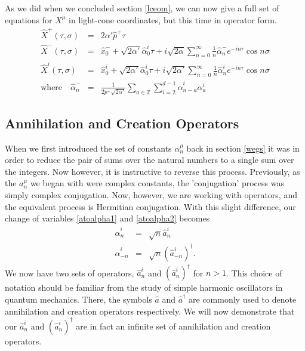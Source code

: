 \documentclass[a4paper,12pt]{article}
\numberwithin{equation}{section}
\begin{document}
As we did when we concluded section \ref{lceom}, we can now give a full set of equations for $X^\mu$ in light-cone coordinates, but this time in operator form.
\begin{eqnarray}
\hat{X}^+(\tau,\sigma) &=& 2\alpha'\hat{p}^+\tau\label{operatorexpansionb}\\
\hat{X}^-(\tau,\sigma) &=& \hat{x}_0^- + \sqrt{2\alpha'}\hat{\alpha}_0^i\tau + i\sqrt{2\alpha}\sum_{n=0}^\infty\frac{1}{n}\hat{\alpha}_n^-e^{-in\tau}\cos n\sigma\\
\hat{X}^i(\tau,\sigma) &=& \hat{x}_0^i +\sqrt{2\alpha'}\hat{\alpha}_0^i\tau + i\sqrt{2\alpha'}\sum_{n=0}^\infty\frac{1}{n}\hat{\alpha}_n^ie^{-in\tau}\cos n\sigma\\
\text{where}\quad\hat{\alpha}_n^- &=& \frac{1}{2p^+\sqrt{2\alpha'}}\sum_{a \in \mathbb{Z}}\sum_{i=2}^{d-1}\hat{\alpha}^i_{n-a}\alpha^i_a\label{operatorexpansione}
\end{eqnarray}
\subsection{Annihilation and Creation Operators}\label{annihilation}
When we first introduced the set of constants $\alpha_n^\mu$ back in section \ref{wegs} it was in order to reduce the pair of sums over the natural numbers to a single sum over the integers. Now however, it is instructive to reverse this process. Previously, as the $a_n^\mu$ we began with were complex constants, the 'conjugation' process was simply complex conjugation. Now, however, we are working with operators, and the equivalent process is Hermitian conjugation. With this slight difference, our change of variables \ref{atoalpha1} and \ref{atoalpha2} becomes
\begin{eqnarray}
\hat{\alpha}_n^i &=& \sqrt{n}\hat{a}_n^i\label{atoalpha3}\\
\hat{\alpha}_{-n}^i &=& \sqrt{n}(\hat{a}_{-n}^i)^\dagger\label{atoalpha4}.
\end{eqnarray} 
We now have two sets of operators, $\hat{a}_n^i$ and $(\hat{a}_n^i)^\dagger$ for $n>1$. This choice of notation should be familiar from the study of simple harmonic oscillators in quantum mechanics\cite{gasiorowicz}. There, the symbols $\hat{a}$ and $\hat{a}^\dagger$ are commonly used to denote annihilation and creation operators respectively. We will now demonstrate that our $\hat{a}_n^i$ and $(\hat{a}_n^i)^\dagger$ are in fact an infinite set of annihilation and creation operators.
\end{document}
